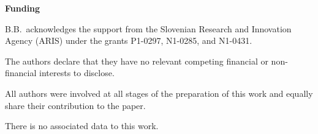 \documentclass{article}
\begin{document}
\medskip

{\bf Funding}

\medskip

\noindent B.B.\ acknowledges the support from the Slovenian Research and Innovation Agency (ARIS) under the grants P1-0297, N1-0285, and N1-0431. 

\bigskip


\medskip

\noindent The authors declare that they have no relevant competing financial or non-financial interests to disclose.


\bigskip


\medskip

\noindent All authors were involved at all stages of the preparation of this work and equally share their contribution to the paper. 

\bigskip


\medskip

\noindent There is no associated data to this work. 
\end{document}
